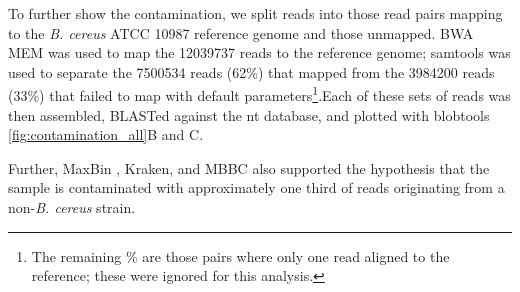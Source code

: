 To further show the contamination, we split reads into those read pairs mapping to the \textit{B. cereus} ATCC 10987 reference genome and those unmapped.  BWA MEM \cite{Li2013} was used to map the 12039737 reads to the reference genome;  samtools was used to separate the 7500534 reads (62\%) that mapped from the 3984200 reads (33\%) that failed to map with default parameters\footnote{The remaining  \% are those pairs where only one read aligned to the reference; these were ignored for this analysis.}.Each of these sets of reads was then assembled, BLASTed against the nt database, and plotted with blobtools \ref{fig:contamination_all}B and C.


Further, MaxBin \cite{Wu2014}, Kraken, and MBBC \cite{Wang2011} also supported the hypothesis that the sample is contaminated with approximately one third of reads originating from a non-\textit{B. cereus} strain.
